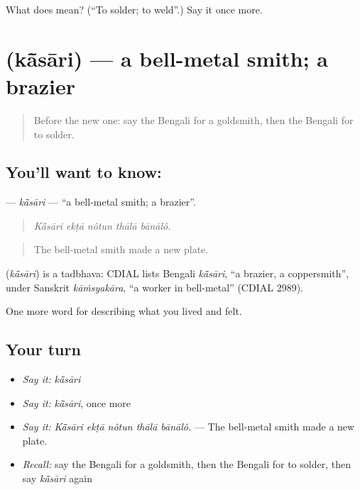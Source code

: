 \begin{tcolorbox}[breakable,colback=teal!4,colframe=teal!35!black,title={Before you move on}]
What does   mean? (\textquotedblleft{}To solder; to weld\textquotedblright{}.) Say it once more.
\end{tcolorbox}
\section[\texorpdfstring{\bn{কাঁসারি} (kā̃sāri)}{কাঁসারি (kā̃sāri)}]{ (kā̃sāri) — a bell-metal smith; a brazier}

\label{lesson:BN-C492-kasari}



\begin{quote}
Before the new one: say the Bengali for a goldsmith, then the Bengali for to solder.
\end{quote}

\subsection*{You'll want to know: }
\textbf{} — \emph{kā̃sāri} — \textquotedblleft{}a bell-metal smith; a brazier\textquotedblright{}.

\begin{quote}
    
\end{quote}

\begin{quote}
\emph{Kā̃sāri ekṭā nôtun thālā bānālô.}
\end{quote}

\begin{quote}
The bell-metal smith made a new plate.
\end{quote}

\begin{cousinweb}
\textbf{} (\emph{kā̃sāri}) is a tadbhava: CDIAL lists Bengali \emph{kā̃sāri}, \textquotedblleft{}a brazier, a coppersmith\textquotedblright{}, under Sanskrit \emph{kāṁsyakāra}, \textquotedblleft{}a worker in bell-metal\textquotedblright{} (CDIAL 2989).
\end{cousinweb}

\begin{grammarlens}[title={What you've built}]
One more word for describing what you lived and felt.
\end{grammarlens}

\subsection*{Your turn}
\begin{itemize}
\raggedright
  \item \emph{Say it:} \emph{kā̃sāri}
  \item \emph{Say it:} \emph{kā̃sāri}, once more
  \item \emph{Say it:} \emph{Kā̃sāri ekṭā nôtun thālā bānālô.} — The bell-metal smith made a new plate.
  \item \emph{Recall:} say the Bengali for a goldsmith, then the Bengali for to solder, then say \emph{kā̃sāri} again
\end{itemize}

